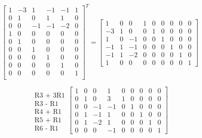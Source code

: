 \documentclass[a4paper]{report}
\begin{document}
\begin{equation*} 
\begin{bmatrix}
1  & -3  &  1  & -1  & -1  &  1  \\
0  &  1  &  0  &  1  &  1  &  0  \\
0  &  0  & -1  & -1  & -2  &  0 \\
\hline
1  &  0  &  0  &  0  &  0  &  0 \\ 
0  &  1  &  0  &  0  &  0  &  0 \\ 
0  &  0  &  1  &  0  &  0  &  0 \\ 
0  &  0  &  0  &  1  &  0  &  0 \\ 
0  &  0  &  0  &  0  &  1  &  0 \\ 
0  &  0  &  0  &  0  &  0  &  1 \\ 
\end{bmatrix}^T
=
\begin{bmatrix}
1  &  0  &  0  &  1  &  0  &  0  &  0  &  0  &  0 \\
-3 &  1  &  0  &  0  &  1  &  0  &  0  &  0  &  0 \\
1  &  0  & -1  &  0  &  0  &  1  &  0  &  0  &  0 \\
-1 &  1  & -1  &  0  &  0  &  0  &  1  &  0  &  0 \\
-1 &  1  & -2  &  0  &  0  &  0  &  0  &  1  &  0 \\
1  &  0  &  0  &  0  &  0  &  0  &  0  &  0  &  1
\end{bmatrix}
\end{equation*}

\begin{equation*}
\begin{matrix}
\\
\text{R3 + 3R1}\\
\text{R3 - R1} \\
\text{R4 + R1} \\
\text{R5 + R1} \\
\text{R6 - R1}
\end{matrix}
\begin{bmatrix}
1  &  0  &  0  &  1  &  0  &  0  &  0  &  0  &  0 \\
0  &  1  &  0  &  3  &  1  &  0  &  0  &  0  &  0 \\
0  &  0  & -1  & -1  &  0  &  1  &  0  &  0  &  0 \\
0  &  1  & -1  &  1  &  0  &  0  &  1  &  0  &  0 \\
0  &  1  & -2  &  1  &  0  &  0  &  0  &  1  &  0 \\
0  &  0  &  0  & -1  &  0  &  0  &  0  &  0  &  1
\end{bmatrix}
\end{equation*}
\end{document}
